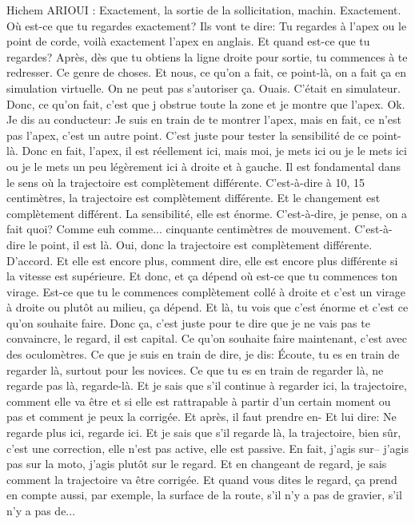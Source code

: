 Hichem ARIOUI : Exactement, la sortie de la sollicitation, machin. Exactement. Où est-ce que tu regardes exactement? Ils vont te dire: Tu regardes à l'apex ou le point de corde, voilà exactement l'apex en anglais. Et quand est-ce que tu regardes? Après, dès que tu obtiens la ligne droite pour sortie, tu commences à te redresser. Ce genre de choses. Et nous, ce qu'on a fait, ce point-là, on a fait ça en simulation virtuelle. On ne peut pas s'autoriser ça. Ouais. C'était en simulateur. Donc, ce qu'on fait, c'est que j obstrue toute la zone et je montre que l'apex. Ok. Je dis au conducteur: Je suis en train de te montrer l'apex, mais en fait, ce n'est pas l'apex, c'est un autre point. C'est juste pour tester la sensibilité de ce point-là. Donc en fait, l'apex, il est réellement ici, mais moi, je mets ici ou je le mets ici ou je le mets un peu légèrement ici à droite et à gauche. Il est fondamental dans le sens où la trajectoire est complètement différente. C'est-à-dire à 10, 15 centimètres, la trajectoire est complètement différente. Et le changement est complètement différent. La sensibilité, elle est énorme. C'est-à-dire, je pense, on a fait quoi? Comme euh comme... cinquante centimètres de mouvement. C'est-à-dire le point, il est là. Oui, donc la trajectoire est complètement différente. D'accord. Et elle est encore plus, comment dire, elle est encore plus différente si la vitesse est supérieure. Et donc, et ça dépend où est-ce que tu commences ton virage. Est-ce que tu le commences complètement collé à droite et c'est un virage à droite ou plutôt au milieu, ça dépend. Et là, tu vois que c'est énorme et c'est ce qu'on souhaite faire. Donc ça, c'est juste pour te dire que je ne vais pas te convaincre, le regard, il est capital. Ce qu'on souhaite faire maintenant, c'est avec des oculomètres. Ce que je suis en train de dire, je dis: Écoute, tu es en train de regarder là, surtout pour les novices. Ce que tu es en train de regarder là, ne regarde pas là, regarde-là. Et je sais que s'il continue à regarder ici, la trajectoire, comment elle va être et si elle est rattrapable à partir d'un certain moment ou pas et comment je peux la corrigée. Et après, il faut prendre en- Et lui dire: Ne regarde plus ici, regarde ici. Et je sais que s'il regarde là, la trajectoire, bien sûr, c'est une correction, elle n'est pas active, elle est passive. En fait, j'agis sur-- j'agis pas sur la moto, j'agis plutôt sur le regard. Et en changeant de regard, je sais comment la trajectoire va être corrigée. 
Et quand vous dites le regard, ça prend en compte aussi, par exemple, la surface de la route, s'il n'y a pas de gravier, s'il n'y a pas de... 

